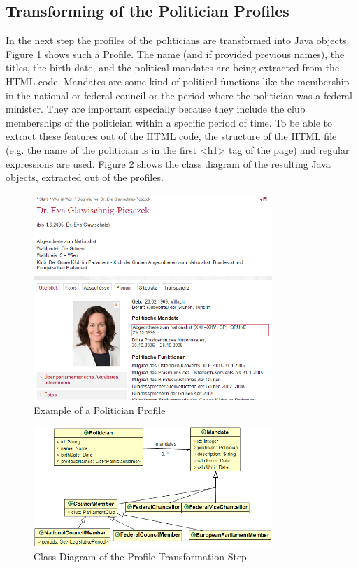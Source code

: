 \subsection{Transforming of the Politician Profiles}
In the next step the profiles of the politicians are transformed into Java objects. Figure \ref{fig:politician_profile_example} shows such a Profile. The name (and if provided previous names), the titles, the birth date, and the political mandates are being extracted from the HTML code. Mandates are some kind of political functions like the membership in the national or federal council or the period where the politician was a federal minister. They are important especially because they include the club memberships of the politician within a specific period of time. To be able to extract these features out of the HTML code, the structure of the HTML file (e.g. the name of the politician is in the first <h1> tag of the page) and regular expressions are used. Figure \ref{fig:politicians_mandates_class_diagram} shows the class diagram of the resulting Java objects, extracted out of the profiles.

\begin{figure}
	\centering
	\includegraphics[width=341px]{imgs/politician_profile_example}
	\caption{Example of a Politician Profile}
	\label{fig:politician_profile_example}
\end{figure}

\begin{figure}
	\centering
	\includegraphics[width=341px]{imgs/politicians_mandates_class_diagram}
	\caption{Class Diagram of the Profile Transformation Step}
	\label{fig:politicians_mandates_class_diagram}
\end{figure}

